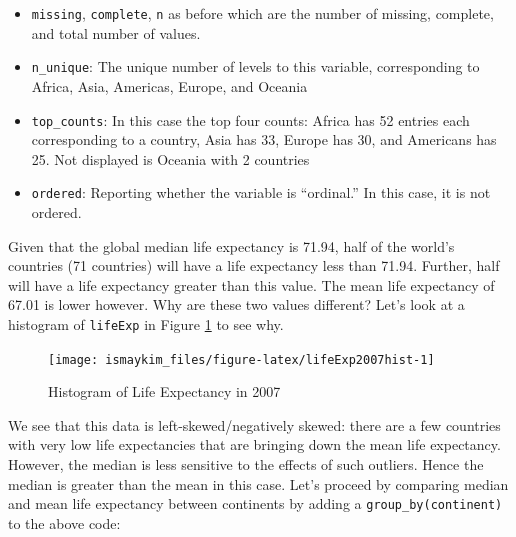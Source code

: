 \documentclass[12pt,]{krantz}
\makeatletter
\newenvironment{Shaded}{\begin{snugshade}}{\end{snugshade}}
\newcommand{\KeywordTok}[1]{\textcolor[rgb]{0.27,0.27,0.27}{\textbf{#1}}}
\newcommand{\DataTypeTok}[1]{\textcolor[rgb]{0.27,0.27,0.27}{#1}}
\newcommand{\StringTok}[1]{\textcolor[rgb]{0.5,0.5,0.5}{#1}}
\newcommand{\OperatorTok}[1]{\textcolor[rgb]{0.43,0.43,0.43}{\textbf{#1}}}
\newcommand{\NormalTok}[1]{#1}
\providecommand{\tightlist}{%
  \setlength{\itemsep}{0pt}\setlength{\parskip}{0pt}}
\newenvironment{kframe}{%
\medskip{}
\setlength{\fboxsep}{.8em}
 \def\at@end@of@kframe{}%
 \ifinner\ifhmode%
  \def\at@end@of@kframe{\end{minipage}}%
  \begin{minipage}{\columnwidth}%
 \fi\fi%
 \def\FrameCommand##1{\hskip\@totalleftmargin \hskip-\fboxsep
 \colorbox{shadecolor}{##1}\hskip-\fboxsep
     \hskip-\linewidth \hskip-\@totalleftmargin \hskip\columnwidth}%
 \MakeFramed {\advance\hsize-\width
   \@totalleftmargin\z@ \linewidth\hsize
   \@setminipage}}%
 {\par\unskip\endMakeFramed%
 \at@end@of@kframe}
\renewenvironment{Shaded}{\begin{kframe}}{\end{kframe}}
\theoremstyle{definition}
\theoremstyle{definition}
\theoremstyle{definition}
\theoremstyle{remark}
\makeatother
\begin{document}
\begin{itemize}
\tightlist
\item
  \texttt{missing}, \texttt{complete}, \texttt{n} as before which are
  the number of missing, complete, and total number of values.
\item
  \texttt{n\_unique}: The unique number of levels to this variable,
  corresponding to Africa, Asia, Americas, Europe, and Oceania
\item
  \texttt{top\_counts}: In this case the top four counts: Africa has 52
  entries each corresponding to a country, Asia has 33, Europe has 30,
  and Americans has 25. Not displayed is Oceania with 2 countries
\item
  \texttt{ordered}: Reporting whether the variable is ``ordinal.'' In
  this case, it is not ordered.
\end{itemize}

Given that the global median life expectancy is 71.94, half of the
world's countries (71 countries) will have a life expectancy less than
71.94. Further, half will have a life expectancy greater than this
value. The mean life expectancy of 67.01 is lower however. Why are these
two values different? Let's look at a histogram of \texttt{lifeExp} in
Figure \ref{fig:lifeExp2007hist} to see why.

\begin{figure}

{\centering \texttt{[image: ismaykim\_files/figure-latex/lifeExp2007hist-1]} 

}

\caption{Histogram of Life Expectancy in 2007}\label{fig:lifeExp2007hist}
\end{figure}

We see that this data is left-skewed/negatively skewed: there are a few
countries with very low life expectancies that are bringing down the
mean life expectancy. However, the median is less sensitive to the
effects of such outliers. Hence the median is greater than the mean in
this case. Let's proceed by comparing median and mean life expectancy
between continents by adding a \texttt{group\_by(continent)} to the
above code:

\begin{Shaded}
\end{Shaded}
\end{document}
